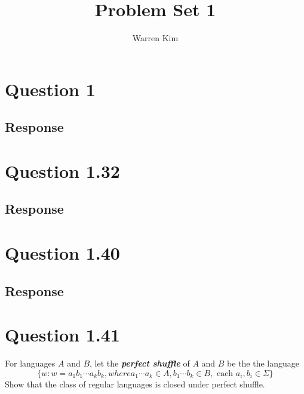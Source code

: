 \documentclass[13pt]{article}
\title{Problem Set 1}
\author{Warren Kim}
\begin{document}
\maketitle

\newpage
\section*{Question 1}
\subsection*{Response}

\newpage
\section*{Question 1.32}
\subsection*{Response}

\newpage
\section*{Question 1.40}

\subsection*{Response}

\newpage
\section*{Question 1.41}
For languages $A$ and $B$, let the \textit{\textbf{perfect shuffle}}
of $A$ and $B$ be the the language 
\[\{w : w = a_1b_1 \cdots a_kb_k, where a_1 \cdots a_k \in A, b_1
  \cdots b_k \in B, \text{ each } a_i, b_i \in \Sigma\}\]
Show that the class of regular languages is closed under perfect
shuffle.
\end{document}
